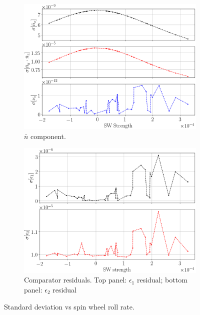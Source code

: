 \begin{figure}[h]
  \centering
  	\begin{subfigure}{\linewidth}
  		\includegraphics[height=.35\paperheight]{images/smp_sim/NBAR_variation_sd_vs_SW}
  		\caption{$\bar n$ component.\label{fig:sd:nbar}}
  	\end{subfigure}
	\begin{subfigure}{\linewidth}
		\includegraphics[height=.35\paperheight]{images/smp_sim/residual_SD_vs_SW(both)}
		\caption{Comparator residuals.
			Top panel: $\epsilon_1$ residual; bottom panel: $\epsilon_2$ residual\label{fig:sd:res}}
	\end{subfigure}
	\caption{Standard deviation vs spin wheel roll rate.\label{fig:sd}}
\end{figure}


